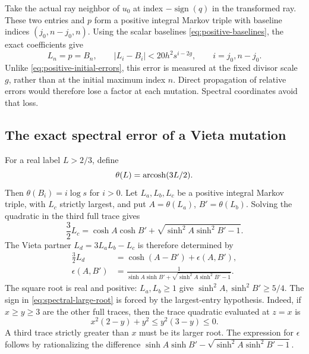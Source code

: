 Take the actual ray neighbor of $u_0$ at index
$-\operatorname{sign}(q)$ in the transformed ray. These two entries
and $p$ form a positive integral Markov triple with baseline indices
$(j_0,n-j_0,n)$. Using the scalar baselines
\eqref{eq:positive-baselines}, the exact coefficients give
\begin{equation}\label{eq:spectral-initial-label-errors}
 L_n=p=B_n,\qquad
 |L_i-B_i|<20h^2s^{i-2g},\qquad i=j_0,n-j_0.
\end{equation}
Unlike \eqref{eq:positive-initial-errors}, this error is measured at
the fixed divisor scale $g$, rather than at the initial maximum index
$n$. Direct propagation of relative errors would therefore lose a
factor at each mutation. Spectral coordinates avoid that loss.

\subsection{The exact spectral error of a Vieta mutation}

For a real label $L>2/3$, define
\begin{equation}\label{eq:spectral-angle}
 \theta(L)=\operatorname{arcosh}(3L/2).
\end{equation}
Then $\theta(B_i)=i\log s$ for $i>0$.
Let $L_a,L_b,L_c$ be a positive integral Markov triple, with $L_c$
strictly largest, and put $A=\theta(L_a)$, $B'=\theta(L_b)$.
Solving the quadratic in the third full trace gives
\begin{equation}\label{eq:spectral-large-root}
 \frac32L_c=\cosh A\cosh B'
       +\sqrt{\sinh^2A\sinh^2B'-1}.
\end{equation}
The Vieta partner $L_d=3L_aL_b-L_c$ is therefore determined by
\begin{equation}\label{eq:spectral-small-root}
 \begin{aligned}
 \frac32L_d&=\cosh(A-B')+\epsilon(A,B'),\\
 \epsilon(A,B')&=
 \frac1{\sinh A\sinh B'+\sqrt{\sinh^2A\sinh^2B'-1}}.
 \end{aligned}
\end{equation}
The square root is real and positive: $L_a,L_b\geqslant1$ give
$\sinh^2A,\sinh^2B'\geqslant5/4$. The sign in
\eqref{eq:spectral-large-root} is forced by the largest-entry
hypothesis. Indeed, if $x\geqslant y\geqslant3$ are the other
full traces, then the trace quadratic evaluated at $z=x$ is
$$
 x^2(2-y)+y^2\leqslant y^2(3-y)\leqslant0.
$$
A third trace strictly greater than $x$ must be its larger root.
The expression for $\epsilon$ follows by rationalizing the difference
$\sinh A\sinh B'-\sqrt{\sinh^2A\sinh^2B'-1}$.

